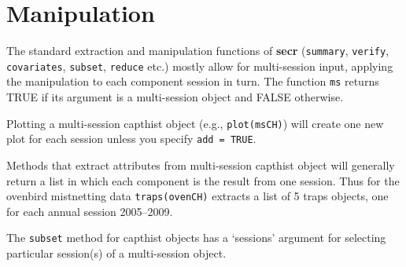 \documentclass[
]{book}
\begin{document}
\section{Manipulation}\label{manipulation}

The standard extraction and manipulation functions of \textbf{secr} (\texttt{summary}, \texttt{verify}, \texttt{covariates}, \texttt{subset}, \texttt{reduce} etc.) mostly allow for multi-session input, applying the manipulation to each component session in turn. The function \texttt{ms} returns TRUE if its argument is a multi-session object and FALSE otherwise.

Plotting a multi-session capthist object (e.g., \texttt{plot(msCH)}) will create one new plot for each session unless you specify \texttt{add\ =\ TRUE}.

Methods that extract attributes from multi-session capthist object will generally return a list in which each component is the result from one session. Thus for the ovenbird mistnetting data \texttt{traps(ovenCH)} extracts a list of 5 traps objects, one for each annual session 2005--2009.

The \texttt{subset} method for capthist objects has a `sessions' argument for selecting particular session(s) of a multi-session object.
\end{document}
